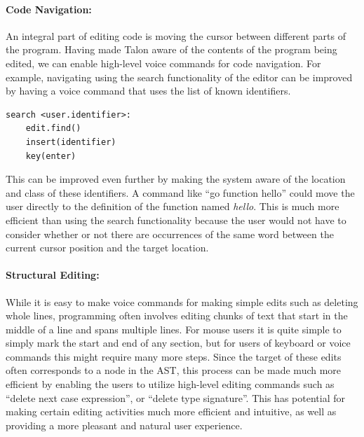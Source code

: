 \documentclass[../thesis.tex]{subfiles}
\begin{document}
\paragraph{Code Navigation:}%
\label{code_navigation}
An integral part of editing code is moving the cursor between different parts of the program.
Having made Talon aware of the contents of the program being edited, we can enable
high-level voice commands for code navigation.
For example, navigating using the search functionality of the editor can be improved
by having a voice command that uses the list of known identifiers.
\begin{verbatim}
search <user.identifier>: 
    edit.find()
    insert(identifier)
    key(enter)
\end{verbatim}
This can be improved even further by making the system aware of the
location and class of these identifiers.
A command like ``go function hello'' could move the user directly to the definition of the function named \textit{hello}.
This is much more efficient than using the search functionality because the user would not have to
consider whether or not there are occurrences of the same word between the current cursor position
and the target location.

\paragraph{Structural Editing:}%
\label{structural_editing}
While it is easy to make voice commands for making simple edits such as deleting whole lines,
programming often involves editing chunks of text that start in the middle of a line
and spans multiple lines. 
For mouse users it is quite simple to simply mark the start and end of any section, but for 
users of keyboard or voice commands this might require many more steps.
Since the target of these edits often corresponds to a node in the AST, this process
can be made much more efficient by enabling the users to utilize high-level editing commands
such as ``delete next case expression'', or ``delete type signature''.
This has potential for making certain editing activities much more efficient and intuitive,
as well as providing a more pleasant and natural user experience.
\end{document}
